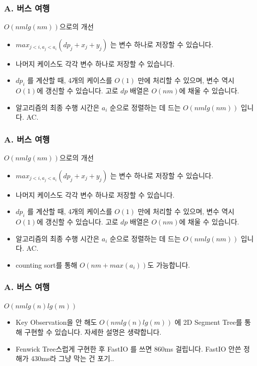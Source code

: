 \documentclass{beamer}
\begin{document}
\begin{frame}
	\frametitle{A. 버스 여행}
	\begin{block}{$O(nmlg(nm))$으로의 개선}
		\begin{itemize}
			\item $max_{j < i, a_j < a_i} (dp_j + x_j + y_j)$ 는 변수 하나로 저장할 수 있습니다.
			\item 나머지 케이스도 각각 변수 하나로 저장할 수 있습니다.
			\item $dp_i$ 를 계산할 때, 4개의 케이스를 $O(1)$ 만에 처리할 수 있으며, 변수 역시 $O(1)$에 갱신할 수 있습니다. 고로 $dp$ 배열은 $O(nm)$에 채울 수 있습니다.
			\item 알고리즘의 최종 수행 시간은 $a_i$ 순으로 정렬하는 데 드는 $O(nmlg(nm))$ 입니다. AC.
		\end{itemize}
	\end{block}
\end{frame}
\begin{frame}
	\frametitle{A. 버스 여행}
	\begin{block}{$O(nmlg(nm))$으로의 개선}
		\begin{itemize}
			\item $max_{j < i, a_j < a_i} (dp_j + x_j + y_j)$ 는 변수 하나로 저장할 수 있습니다.
			\item 나머지 케이스도 각각 변수 하나로 저장할 수 있습니다.
			\item $dp_i$ 를 계산할 때, 4개의 케이스를 $O(1)$ 만에 처리할 수 있으며, 변수 역시 $O(1)$에 갱신할 수 있습니다. 고로 $dp$ 배열은 $O(nm)$에 채울 수 있습니다.
			\item 알고리즘의 최종 수행 시간은 $a_i$ 순으로 정렬하는 데 드는 $O(nmlg(nm))$ 입니다. AC.
			\item counting sort를 통해 $O(nm + max(a_i))$도 가능합니다.
		\end{itemize}
	\end{block}
\end{frame}
\begin{frame}
	\frametitle{A. 버스 여행}
	\begin{block}{$O(nmlg(n)lg(m))$}
		\begin{itemize}
			\item Key Observation을 안 해도 $O(nmlg(n)lg(m))$ 에 2D Segment Tree를 통해 구현할 수 있습니다. 자세한 설명은 생략합니다.
			\item Fenwick Tree스럽게 구현한 후 FastIO 를 쓰면 860ms 걸립니다. FastIO 안쓴 정해가 430ms라 그냥 막는 건 포기..
		\end{itemize}
	\end{block}
\end{frame}
\end{document}
